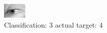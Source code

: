 \begin{figure}[h!]
\begin{center}
\includegraphics[width=0.60\columnwidth]{figures/ID2975_class_3_target_4.png}
\end{center}
\caption{ Classification: 3 actual target: 4}
\label{fig:ID2975_class_3_target_4}
\end{figure}
